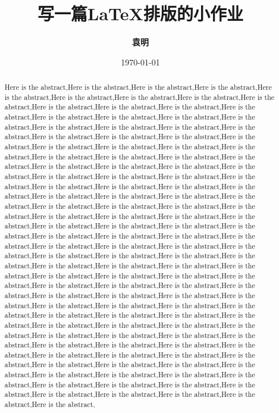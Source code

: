 \documentclass[onecolumn]{article}
\title{\kaishu 写一篇\LaTeX{}排版的小作业}
\author{\textbf{\kaishu 袁明}}
\date{\today}
\begin{document}
\maketitle
 
    \begin{abstract}
        Here is the abstract,Here is the abstract,Here is the abstract,Here is the abstract,Here is the abstract,Here is the abstract,Here is the abstract,Here is the abstract,Here is the abstract,Here is the abstract,Here is the abstract,Here is the abstract,Here is the abstract,Here is the abstract,Here is the abstract,Here is the abstract,Here is the abstract,Here is the abstract,Here is the abstract,Here is the abstract,Here is the abstract,Here is the abstract,Here is the abstract,Here is the abstract,Here is the abstract,Here is the abstract,Here is the abstract,Here is the abstract,Here is the abstract,Here is the abstract,Here is the abstract,Here is the abstract,Here is the abstract,Here is the abstract,Here is the abstract,Here is the abstract,Here is the abstract,Here is the abstract,Here is the abstract,Here is the abstract,Here is the abstract,Here is the abstract,Here is the abstract,Here is the abstract,Here is the abstract,Here is the abstract,Here is the abstract,Here is the abstract,Here is the abstract,Here is the abstract,Here is the abstract,Here is the abstract,Here is the abstract,Here is the abstract,Here is the abstract,Here is the abstract,Here is the abstract,Here is the abstract,Here is the abstract,Here is the abstract,Here is the abstract,Here is the abstract,Here is the abstract,Here is the abstract,Here is the abstract,Here is the abstract,Here is the abstract,Here is the abstract,Here is the abstract,Here is the abstract,Here is the abstract,Here is the abstract,Here is the abstract,Here is the abstract,Here is the abstract,Here is the abstract,Here is the abstract,Here is the abstract,Here is the abstract,Here is the abstract,Here is the abstract,Here is the abstract,Here is the abstract,Here is the abstract,Here is the abstract,Here is the abstract,Here is the abstract,Here is the abstract,Here is the abstract,Here is the abstract,Here is the abstract,Here is the abstract,Here is the abstract,Here is the abstract,Here is the abstract,Here is the abstract,Here is the abstract,Here is the abstract,Here is the abstract,Here is the abstract,Here is the abstract,Here is the abstract,Here is the abstract,Here is the abstract,Here is the abstract,Here is the abstract,Here is the abstract,Here is the abstract,Here is the abstract,Here is the abstract,Here is the abstract,Here is the abstract,Here is the abstract,Here is the abstract,Here is the abstract,Here is the abstract,Here is the abstract,Here is the abstract,Here is the abstract,Here is the abstract,Here is the abstract,Here is the abstract,Here is the abstract,Here is the abstract,Here is the abstract,Here is the abstract,Here is the abstract,Here is the abstract,Here is the abstract,Here is the abstract,
    \end{abstract}
\end{document}
